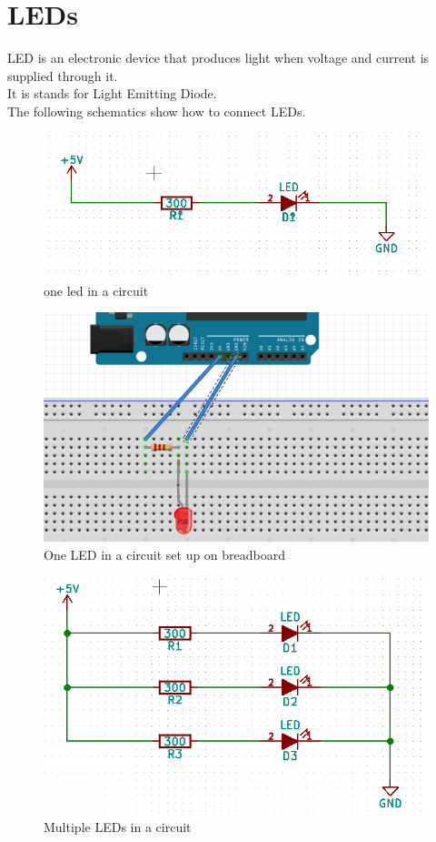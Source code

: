 \documentclass[14pt, oneside]{memoir}
\begin{document}
\section*{LEDs}
LED is an electronic device that produces light when voltage and
current is supplied through it.
\\
It is stands for Light Emitting Diode.
\\
The following schematics show how to connect LEDs.
\begin{figure}[h]
    \includegraphics[width=\linewidth]{circuit_images/one_led.png}
    \caption{one led in a circuit}
\end{figure}
\begin{figure}[H]
    \includegraphics[width=0.7\linewidth]{./circuit_images/fritz_one_led.png}
    \caption{One LED in a circuit set up on breadboard}
\end{figure}

\begin{figure}[H]
    \includegraphics[width=0.7\linewidth]{circuit_images/multiple_leds.png}
    \caption{Multiple LEDs in a circuit}
\end{figure}
\end{document}
